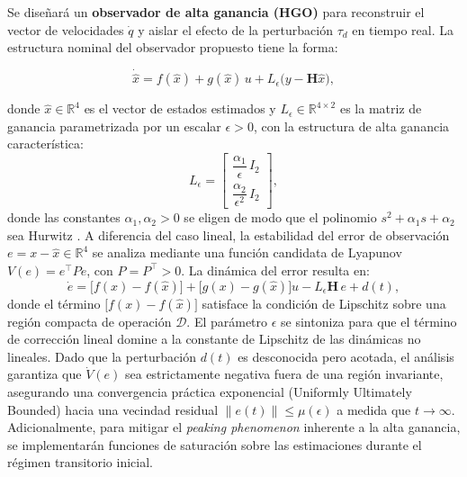 \documentclass[a4paper,12pt]{article}
\begin{document}
Se diseñará un \textbf{observador de alta ganancia (HGO)} para reconstruir el vector de velocidades $\dot{q}$ y aislar el efecto de la perturbación $\tau_d$ en tiempo real. La estructura nominal del observador propuesto tiene la forma:

\begin{equation}
    \dot{\hat{x}} = f(\hat{x}) + g(\hat{x})\,u + L_{\epsilon}\bigl(y - \mathbf{H}\hat{x}\bigr),
    \label{eq:observador}
\end{equation}

\noindent donde $\hat{x}\in\mathbb{R}^{4}$ es el vector de estados estimados y $L_{\epsilon}\in\mathbb{R}^{4\times 2}$ es la matriz de ganancia parametrizada por un escalar $\epsilon > 0$, con la estructura de alta ganancia característica:
\begin{equation}
    L_{\epsilon} = \begin{bmatrix} \dfrac{\alpha_{1}}{\epsilon}\,I_{2} \\[6pt] \dfrac{\alpha_{2}}{\epsilon^{2}}\,I_{2} \end{bmatrix},
    \label{eq:hgo_gain}
\end{equation}
\noindent donde las constantes $\alpha_{1},\alpha_{2}>0$ se eligen de modo que el polinomio $s^{2}+\alpha_{1}s+\alpha_{2}$ sea Hurwitz \citep{khalil2017hgo}. A diferencia del caso lineal, la estabilidad del error de observación $e = x - \hat{x}\in\mathbb{R}^{4}$ se analiza mediante una función candidata de Lyapunov $V(e)=e^{\top}Pe$, con $P=P^{\top}>0$. La dinámica del error resulta en:
\begin{equation}
    \dot{e} = \bigl[f(x)-f(\hat{x})\bigr] + \bigl[g(x)-g(\hat{x})\bigr]u - L_{\epsilon}\mathbf{H}\,e + d(t),
    \label{eq:error_obs}
\end{equation}
donde el término $\bigl[f(x)-f(\hat{x})\bigr]$ satisface la condición de Lipschitz sobre una región compacta de operación $\mathcal{D}$. El parámetro $\epsilon$ se sintoniza para que el término de corrección lineal domine a la constante de Lipschitz de las dinámicas no lineales. Dado que la perturbación $d(t)$ es desconocida pero acotada, el análisis garantiza que $\dot{V}(e)$ sea estrictamente negativa fuera de una región invariante, asegurando una convergencia práctica exponencial (Uniformly Ultimately Bounded) hacia una vecindad residual $\|e(t)\| \leq \mu(\epsilon)$ a medida que $t \to \infty$. Adicionalmente, para mitigar el \textit{peaking phenomenon} inherente a la alta ganancia, se implementarán funciones de saturación sobre las estimaciones durante el régimen transitorio inicial.
\end{document}
